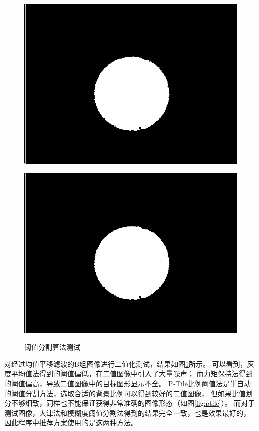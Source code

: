 \documentclass[12pt,a4paper]{report}
\begin{document}
\begin{figure}[!htbp]
\begin{minipage}{0.48\linewidth}
        \includegraphics[width=\linewidth]{otsu.png}
        \label{fig:otsu}
    \end{minipage} \hfill
    \begin{minipage}{0.48\linewidth}
        \centering
        \includegraphics[width=\linewidth]{fuzziness.png}
        \label{fig:fuzziness}
    \end{minipage}
    \caption{阈值分割算法测试}\label{fig:threshold}
\end{figure}

对经过均值平移滤波的B组图像进行二值化测试，结果如图\ref{fig:threshold}所示。
可以看到，灰度平均值法得到的阈值偏低，在二值图像中引入了大量噪声；
而力矩保持法得到的阈值偏高，导致二值图像中的目标图形显示不全。
P-Tile比例阈值法是半自动的阈值分割方法，选取合适的背景比例可以得到较好的二值图像，
但如果比值划分不够细致，同样也不能保证获得非常准确的图像形态（如图\ref{fig:ptile}）。
而对于测试图像，大津法和模糊度阈值分割法得到的结果完全一致，也是效果最好的，
因此程序中推荐方案使用的是这两种方法。
\end{document}

